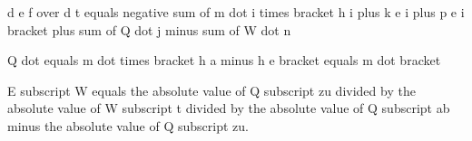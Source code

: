d e f over d t equals negative sum of m dot i times bracket h i plus k e i plus p e i bracket plus sum of Q dot j minus sum of W dot n

Q dot equals m dot times bracket h a minus h e bracket equals m dot bracket

E subscript W equals the absolute value of Q subscript zu divided by the absolute value of W subscript t divided by the absolute value of Q subscript ab minus the absolute value of Q subscript zu.